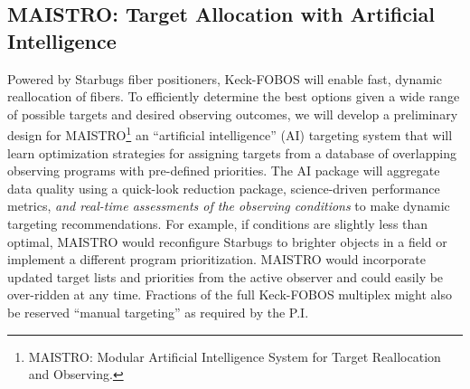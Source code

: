 \documentclass[oneside,11pt]{amsart}
\newcommand{\comment}[2][todo]{{\color{#1}[[{\bf #2}]]}}
\begin{document}


\subsection{MAISTRO: Target Allocation with Artificial Intelligence}
\label{sec:targeting}

Powered by Starbugs fiber positioners, Keck-FOBOS will enable fast, dynamic reallocation of fibers.  To efficiently
determine the best options given a wide range of possible targets and desired observing outcomes, we will develop a
preliminary design for MAISTRO\footnote{MAISTRO: Modular Artificial Intelligence System for Target Reallocation and
Observing.} an ``artificial intelligence'' (AI) targeting system that will learn optimization strategies for assigning
targets from a database of overlapping observing programs with pre-defined priorities.  The AI package will aggregate
data quality using a quick-look reduction package, science-driven performance metrics, {\it and real-time assessments
of the observing conditions} to make dynamic targeting recommendations.  For example, if conditions are
slightly less than optimal, MAISTRO would reconfigure Starbugs to brighter objects in a field or implement a different program prioritization.  MAISTRO would incorporate updated target lists and priorities from the active observer and could easily be over-ridden at any time.   Fractions of the full Keck-FOBOS multiplex might also be reserved ``manual targeting'' as required by the P.I.  


\end{document}
